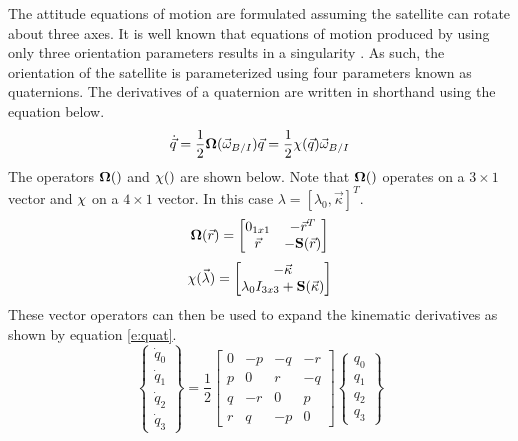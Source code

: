 \documentclass{article}
\begin{document}
The attitude equations of motion are formulated assuming the satellite
can rotate about three axes. It is well known that equations of motion
produced by using only three orientation parameters results in a
singularity \cite{etkins}. As such, the orientation of the satellite is
parameterized using four parameters known as quaternions. The
derivatives of a quaternion are written in shorthand using the
equation below. 
\begin{equation}
  \dot{\vec{q}} = \frac{1}{2}{\bf \Omega}(\vec{\omega}_{B/I})\vec{q} =
  \frac{1}{2}{\bf \chi}(\vec{q})\vec{\omega}_{B/I}
\end{equation}
The operators ${\bf \Omega}()$ and ${\bf \chi}()$ are shown below. Note that
${\bf \Omega}()$ operates on a $3 \times 1$ vector and ${\bf \chi}$ on a $4 \times 1$ vector.
In this case $\lambda = [\lambda_0,\vec{\kappa}]^T$.
\begin{equation}
  {\bf \Omega}(\vec{r}) = \begin{bmatrix} 0_{1x1} & -\vec{r}^T \\ \vec{r} &
    -{\bf S}(\vec{r})\end{bmatrix}
\end{equation}
\begin{equation}
  {\bf \chi}(\vec{\lambda}) = \begin{bmatrix} -\vec{\kappa}
    \\ \lambda_0I_{3x3} + {\bf S}(\vec{\kappa}) \end{bmatrix}
\end{equation}
These vector operators can then be used to expand the kinematic
derivatives as shown by equation \ref{e:quat}.
\begin{equation}\label{e:quat}
  \begin{Bmatrix} \dot{q}_{0} \\ \dot{q}_{1} \\ \dot{q}_{2}
    \\ \dot{q}_{3} \end{Bmatrix} = \frac{1}{2} \begin{bmatrix} 0 & -p & -q & -r
    \\ p & 0 & r & -q \\ q & -r & 0 & p \\ r & q & -p & 0 \end{bmatrix} \begin{Bmatrix} q_{0}
    \\ q_{1} \\ q_{2} \\ q_{3} \end{Bmatrix}
\end{equation}
\end{document}
